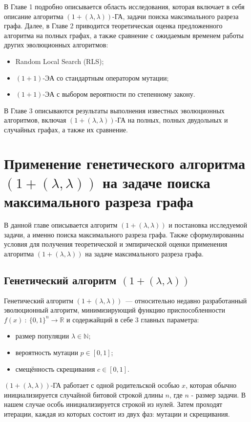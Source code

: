\documentclass[times]{itmo-student-thesis}
\newcommand{\alglambda}{${(1 + (\lambda , \lambda))}$\xspace}
\newcommand{\alglambdaf}{${(1 + (\lambda , \lambda))}$-ГА\xspace}
\newcommand{\oea}{\mbox{$(1 + 1)$-ЭА}\xspace}
\newcommand{\N}{{\mathbb N}}
\newcommand{\R}{{\mathbb R}}
\begin{document}
В Главе 1 подробно описывается область исследования, которая включает в себя описание алгоритма \alglambdaf, задачи поиска максимального разреза графа.
Далее, в Главе 2 приводится теоретическая оценка предложенного алгоритма на полных графах, а также сравнение с ожидаемым временем работы других эволюционных алгоритмов:
\begin{itemize}
  \item Random Local Search (RLS);
  \item \oea со стандартным оператором мутации;
  \item \oea с выбором вероятности по степенному закону.
\end{itemize}

В Главе 3 описываются результаты выполнения известных эволюционных алгоритмов, включая \alglambdaf на полных, полных двудольных и случайных графах, а также их сравнение.

\chapter{Применение генетического алгоритма \alglambda на задаче поиска максимального разреза графа}

\startrelatedwork
В данной главе описывается алгоритм \alglambda и постановка исследуемой задачи, а именно поиска максимального разреза графа.
Также сформулированны условия для получения теоретической и эмпирической оценки применения алгоритма \alglambda на задаче максимального разреза графа.
\finishrelatedwork

\section{Генетический алгоритм \alglambda}

Генетический алгоритм \alglambda~--- относительно недавно разработанный эволюционный алгоритм, минимизирующий функцию приспособленности $f(x)~:~\{0, 1\}^n \rightarrow \R$ и содержайщий в себе 3 главных параметра:
\begin{itemize}
   \item размер популяции $\lambda \in \N$;
   \item вероятность мутации $p \in [0, 1]$;
   \item смещённость скрещивания $c \in [0, 1]$.
\end{itemize}
\alglambdaf работает с одной родительской особью $x$, которая обычно инициализируется случайной битовой строкой длины $n$, где $n$ - размер задачи. В нашем случае особь инициализируется строкой из нулей. Затем проходят итерации, каждая из которых состоит из двух фаз: мутации и скрещивания.
\end{document}
